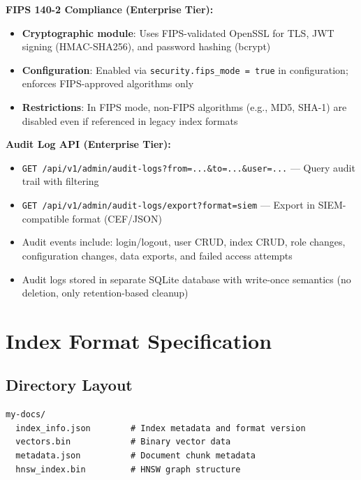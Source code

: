 \documentclass[11pt,a4paper]{article}
\newcommand{\inlinecode}[1]{\texttt{\small\colorbox{ctCodeBg}{#1}}}
\begin{document}
\begin{reqbox}
\textbf{FIPS 140-2 Compliance (Enterprise Tier):}
\begin{itemize}
    \item \textbf{Cryptographic module}: Uses FIPS-validated OpenSSL for TLS, JWT signing (HMAC-SHA256), and password hashing (bcrypt)
    \item \textbf{Configuration}: Enabled via \inlinecode{security.fips\_mode = true} in configuration; enforces FIPS-approved algorithms only
    \item \textbf{Restrictions}: In FIPS mode, non-FIPS algorithms (e.g., MD5, SHA-1) are disabled even if referenced in legacy index formats
\end{itemize}

\textbf{Audit Log API (Enterprise Tier):}
\begin{itemize}
    \item \inlinecode{GET /api/v1/admin/audit-logs?from=...&to=...&user=...} --- Query audit trail with filtering
    \item \inlinecode{GET /api/v1/admin/audit-logs/export?format=siem} --- Export in SIEM-compatible format (CEF/JSON)
    \item Audit events include: login/logout, user CRUD, index CRUD, role changes, configuration changes, data exports, and failed access attempts
    \item Audit logs stored in separate SQLite database with write-once semantics (no deletion, only retention-based cleanup)
\end{itemize}
\end{reqbox}

\newpage
\appendix
\section{Index Format Specification}

\subsection{Directory Layout}

\begin{lstlisting}[language={},title={Index Directory Structure}]
my-docs/
  index_info.json        # Index metadata and format version
  vectors.bin            # Binary vector data
  metadata.json          # Document chunk metadata
  hnsw_index.bin         # HNSW graph structure
\end{lstlisting}
\end{document}

